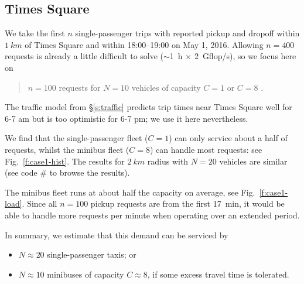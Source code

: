 \documentclass[12pt,notitlepage]{article}
\begin{document}
\subsection{Times Square} \label{s:case1}

\edef\codecaseone{\thecodeindex}

We take
the first $n$ single-passenger trips 
with
reported pickup and dropoff 
within
$\SI{1}{km}$ of Times Square
and
within 
18:00--19:00 on May 1, 2016.
%
%	
Allowing $n = 400$ requests
is already a little difficult to solve ($\sim$\SI{1}{h} $\times$ \SI{2}{Gflop/s}),
so we focus here on
\begin{quote}
	$n = 100$ requests
	for
	$N = 10$ vehicles of capacity $C = 1$ or $C = 8$
	.
\end{quote}


%

The traffic model from \S\ref{s:traffic} predicts trip times
near Times Square well for 6-7 am
but is too optimistic for 6-7 pm;
we use it here nevertheless.
%
\edef\codetriptime{\thecodeindex}

%

We find that the single-passenger fleet ($C = 1$)
can only service about a half of requests,
whilst
the minibus fleet ($C = 8$) can handle most requests:
see Fig.~\ref{f:case1-hist}.
%
%
The results for $\SI{2}{km}$ radius with $N = 20$ 
vehicles are similar (see code \#\codecaseone\xspace to browse the results).

%

The minibus fleet runs at about half the capacity on average, see Fig.~\ref{f:case1-load}.
%
Since all $n = 100$ pickup requests are from the first \SI{17}{min},
it would be able to handle more requests per minute
when operating over an extended period.

%

In summary,
we estimate that this demand can be serviced by 
\begin{itemize}
\item 
	$N \approx 20$ single-passenger taxis; or
\item
	$N \approx 10$ minibuses of capacity $C \approx 8$,
	if some excess travel time is tolerated.
\end{itemize}

%


\end{document}
